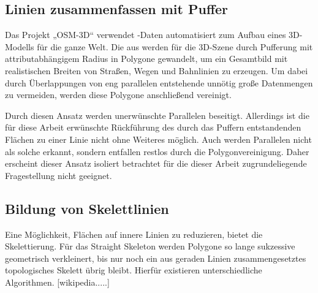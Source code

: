 \documentclass[../main/thesis.tex]{subfiles}
\begin{document}
\subsection{Linien zusammenfassen mit Puffer} \label{buffer}

Das Projekt „OSM-3D“ verwendet \osm-Daten automatisiert zum Aufbau eines 3D-Modells für die ganze Welt. Die  aus \osm{} werden für die 3D-Szene durch Pufferung mit attributabhängigem Radius in Polygone gewandelt, um ein Gesamtbild mit realistischen Breiten von Straßen, Wegen und Bahnlinien zu erzeugen. Um dabei durch Überlappungen von eng parallelen  entstehende unnötig große Datenmengen zu vermeiden, werden diese Polygone anschließend vereinigt. 

Durch diesen Ansatz werden unerwünschte Parallelen beseitigt. Allerdings ist die für diese Arbeit erwünschte Rückführung des durch das Puffern entstandenden Flächen zu einer Linie nicht ohne Weiteres möglich. Auch werden Parallelen nicht als solche erkannt, sondern entfallen restlos durch die Polygonvereinigung. Daher erscheint dieser Ansatz isoliert betrachtet für die dieser Arbeit zugrundeliegende Fragestellung nicht geeignet.


\subsection{Bildung von Skelettlinien}

Eine Möglichkeit, Flächen auf innere Linien zu reduzieren, bietet die Skelettierung. Für das Straight Skeleton werden Polygone so lange sukzessive geometrisch verkleinert, bis nur noch ein aus geraden Linien zusammengesetztes topologisches Skelett übrig bleibt. Hierfür existieren unterschiedliche Algorithmen. [wikipedia.....]
\end{document}
